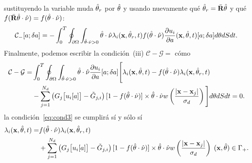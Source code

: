 sustituyendo la variable muda $\hat{\theta}_r$ por $\hat{\theta}$ y usando nuevamente qué $\hat{\theta}_r=\bar{\mathbf{R}} \hat{\theta}$ 
y qué $f(\bar{\mathbf{R}} \hat{\theta} \cdot \hat{\nu})=f(\hat{\theta} \cdot \hat{\nu})$:
\begin{equation}
\begin{split}
\begin{aligned}
  \displaystyle\mathcal{C}_-[a;\delta a]=-\int_0^T
  \oint_{\partial \Omega} \int_{\hat{\theta} \cdot \hat{\nu}>0} \hat{\theta} \cdot \hat{\nu} \lambda_i(\mathbf{x},\hat{\theta}_r,t)
  f(\hat{\theta} \cdot \hat{\nu}) \frac{\partial u_i}{\partial a}(\mathbf{x},\hat{\theta},t)[a;\delta a] d\theta  dS dt.
\end{aligned}
\end{split}
\label{eq:C2m3}
\end{equation}
Finalmente, podemos escribir la condición~(iii) $\mathcal{C}-\mathcal{G}=$ cómo
\begin{equation}
\begin{split}
\begin{aligned}
  \displaystyle\mathcal{C}-\mathcal{G}=&\int_0^T
  \oint_{\partial \Omega} \int_{\hat{\theta} \cdot \hat{\nu}>0} \hat{\theta} \cdot \hat{\nu} 
  \frac{\partial u_i}{\partial a}[a;\delta a] \Bigg[  \lambda_i(\mathbf{x},\hat{\theta},t)
    -f(\hat{\theta} \cdot \hat{\nu})  \lambda_i(\mathbf{x},\hat{\theta}_r,t)   \\
    &- \sum_{j=1}^{N_d} \left( G_j\big[u_i[a]\big]-
    \tilde {G}_{j,i} \right) [1-f(\hat{\theta} \cdot \hat{\nu})]
   \times \hat{\theta} \cdot \hat{\nu} w\left( \frac{ |\mathbf{x}-\mathbf{x}_j |}{\sigma_d}
  \right) 
   \Bigg] d\theta  dS dt=0.
\end{aligned}
\end{split}
\label{eq:cond3}
\end{equation}
la condición~\eqref{eq:cond3} se cumplirá sí y sólo sí 
\begin{equation}
\begin{split}
\begin{aligned}
  \lambda_i(\mathbf{x},\hat{\theta},t)=&
    f(\hat{\theta} \cdot \hat{\nu}) \lambda_i(\mathbf{x},\hat{\theta}_r,t) \\
   &+ \sum_{j=1}^{N_d} \left( G_j\big[u_i[a]\big]-
    \tilde {G}_{j,i} \right) [1-f(\hat{\theta} \cdot \hat{\nu})]
   \times \hat{\theta} \cdot \hat{\nu} w\left( \frac{ |\mathbf{x}-\mathbf{x}_j |}{\sigma_d}
  \right)\; (\mathbf{x},\hat{\theta})\in \Gamma_+.
\end{aligned}
\end{split}
\label{eq:cond4}
\end{equation}

